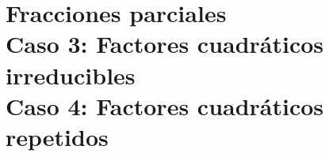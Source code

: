 \documentclass[openany]{book}
\begin{document}
\chapter{Fracciones parciales \\ Caso 3: Factores cuadráticos irreducibles \\ Caso 4: Factores cuadráticos repetidos }






\end{document}
